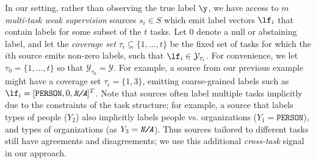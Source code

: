\documentclass[letterpaper]{article}
\begin{document}
In our setting, rather than observing the true label $\y$, we have access to $m$ \textit{multi-task weak supervision} sources $s_i \in S$ which emit label vectors $\lf_i$ that contain labels for some subset of the $t$ tasks.
Let $0$ denote a null or abstaining label, and let the \textit{coverage set} $\tau_i \subseteq \{1, \ldots, t\}$ be the fixed set of tasks for which the $i$th source emits non-zero labels, such that $\lf_i \in \mathcal{Y}_{\tau_{i}}$.
For convenience, we let $\tau_0 = \{1, \ldots, t\}$ so that $\mathcal{Y}_{\tau_0} = \mathcal{Y}$.
For example, a source from our previous example might have a coverage set $\tau_i = \{1,3\}$, emitting coarse-grained labels such as $\lf_i = [\texttt{PERSON}, 0, \textit{\texttt{N/A}}]^T$.
Note that sources often label multiple tasks implicitly due to the constraints of the task structure; for example, a source that labels types of people ($Y_2$) also implicitly labels people vs. organizations ($Y_1 = \texttt{PERSON}$), and types of organizations (as $Y_3 = \textit{\texttt{N/A}}$).
Thus sources tailored to different tasks still have agreements and disagreements; we use this additional \textit{cross-task} signal in our approach.
\end{document}
